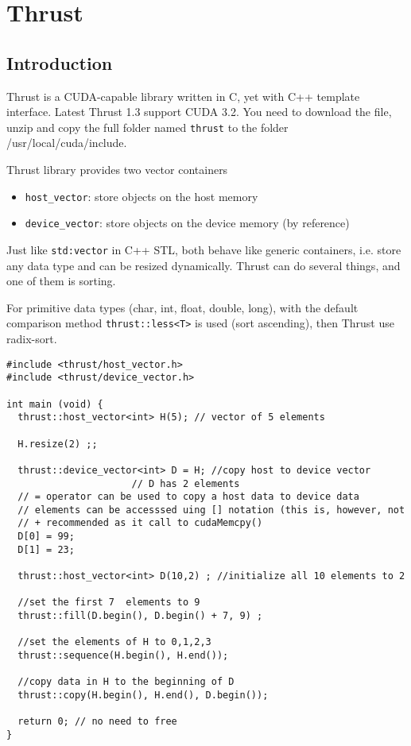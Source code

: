 
\chapter{Thrust}
\label{chap:thrust}


\section{Introduction}
\label{sec:introduction-3}


Thrust is a CUDA-capable library written in C, yet with C++ template
interface. %
Latest Thrust 1.3 support CUDA 3.2. 
You need to download the file, unzip and copy the full folder named
\verb!thrust! to the folder /usr/local/cuda/include.

Thrust library provides two vector containers 
\begin{itemize}
\item \verb!host_vector!: store objects on the host memory
\item \verb!device_vector!: store objects on the device memory (by reference)
\end{itemize}
Just like \verb!std:vector! in C++ STL, both behave like generic
containers, i.e. store any data type and can be resized dynamically.
Thrust can do several things, and one of them is sorting.

For primitive data types (char, int, float, double, long), with the
default comparison method \verb!thrust::less<T>! is used (sort
ascending), then Thrust use radix-sort.

\begin{lstlisting}
#include <thrust/host_vector.h>
#include <thrust/device_vector.h>

int main (void) {
  thrust::host_vector<int> H(5); // vector of 5 elements

  H.resize(2) ;; 

  thrust::device_vector<int> D = H; //copy host to device vector
                      // D has 2 elements
  // = operator can be used to copy a host data to device data
  // elements can be accesssed uing [] notation (this is, however, not 
  // + recommended as it call to cudaMemcpy()
  D[0] = 99;
  D[1] = 23;

  thrust::host_vector<int> D(10,2) ; //initialize all 10 elements to 2

  //set the first 7  elements to 9
  thrust::fill(D.begin(), D.begin() + 7, 9) ; 

  //set the elements of H to 0,1,2,3
  thrust::sequence(H.begin(), H.end());

  //copy data in H to the beginning of D
  thrust::copy(H.begin(), H.end(), D.begin());

  return 0; // no need to free 
}
\end{lstlisting}

